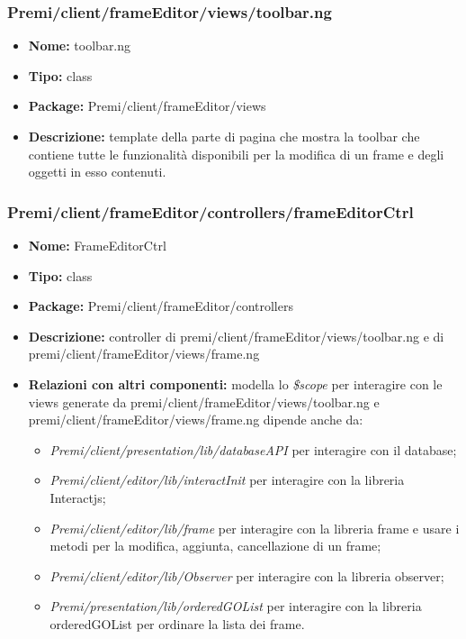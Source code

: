 \subsubsection{Premi/client/frameEditor/views/toolbar.ng}
\begin{itemize}
  \item[] \textbf{Nome:} toolbar.ng
  \item[] \textbf{Tipo:} class
  \item[] \textbf{Package:} Premi/client/frameEditor/views
  \item[] \textbf{Descrizione:} template della parte di pagina che mostra la toolbar che contiene tutte le funzionalità disponibili per la modifica di un frame e degli oggetti in esso contenuti.
\end{itemize}
\subsubsection{Premi/client/frameEditor/controllers/frameEditorCtrl}
\begin{itemize}
  \item[] \textbf{Nome:} FrameEditorCtrl
  \item[] \textbf{Tipo:} class
  \item[] \textbf{Package:} Premi/client/frameEditor/controllers
  \item[] \textbf{Descrizione:} controller di premi/client/frameEditor/views/toolbar.ng e di premi/client/frameEditor/views/frame.ng
  \item[] \textbf{Relazioni con altri componenti:} modella lo \textit{\$scope} per interagire con le views generate da premi/client/frameEditor/views/toolbar.ng e premi/client/frameEditor/views/frame.ng dipende anche da:
 \begin{itemize} 
	\item \textit{Premi/client/presentation/lib/databaseAPI} per interagire con il database;  
	\item \textit{Premi/client/editor/lib/interactInit} per interagire con la libreria Interactjs;
	\item \textit{Premi/client/editor/lib/frame} per interagire con la libreria frame e usare i metodi per la modifica, aggiunta, cancellazione di un frame;
	\item \textit{Premi/client/editor/lib/Observer} per interagire con la libreria observer; 
	\item \textit{Premi/presentation/lib/orderedGOList} per interagire con la libreria orderedGOList per ordinare la lista dei frame. 
  \end{itemize} 
\end{itemize}

